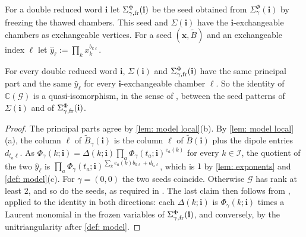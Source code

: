 \documentclass[a4paper]{amsart}
\numberwithin{equation}{section}
\theoremstyle{definition}
\theoremstyle{remark}
\newcommand{\bbC}{\mathbb{C}}
\newcommand{\mcG}{\mathcal{G}}
\newcommand{\mcI}{\mathcal{I}}
\newcommand{\bfi}{\mathbf{i}}
\newcommand{\bx}{\mathbf{x}}
\newcommand{\tB}{\widetilde{B}}
\begin{document}
For a double reduced word $\bfi$ let $\Sigma^\Phi_{\gamma,\rm fr}(\bfi)$ be the seed obtained from $\Sigma^\Phi_\gamma(\bfi)$ by freezing the thawed chambers. This seed and $\Sigma(\bfi)$ have the $\bfi$-exchangeable chambers as exchangeable vertices.
For a seed $(\bx,\tB)$ and an exchangeable index $\ell$ let $\hat y_\ell:=\prod_kx_k^{b_{k\ell}}$.

\begin{corollary}
  \label{cor: Fraser}
  For every double reduced word $\bfi$, $\Sigma(\bfi)$ and $\Sigma^\Phi_{\gamma,\rm fr}(\bfi)$ have the same principal part and the same $\hat y_\ell$ for every $\bfi$-exchangeable chamber $\ell$.
  So the identity of $\bbC(\mcG)$ is a quasi-isomorphism, in the sense of \cite[Definition~3.5]{Fra16}, between the seed patterns of $\Sigma(\bfi)$ and of $\Sigma^\Phi_{\gamma,\rm fr}(\bfi)$.
\end{corollary}
\begin{proof}

  The principal parts agree by \cref{lem: model local}(b).
  By \cref{lem: model local}(a), the column $\ell$ of $\tB_\gamma(\bfi)$ is the column $\ell$ of $\tB(\bfi)$ plus the dipole entries $d_{t_a\ell}$.
  As $\Phi_\gamma(k;\bfi)=\Delta(k;\bfi)\prod_a\Phi_\gamma(t_a;\bfi)^{e_a(k)}$ for every $k\in\mcI$, the quotient of the two $\hat y_\ell$ is $\prod_a\Phi_\gamma(t_a;\bfi)^{\sum_ke_a(k)b_{k\ell}+d_{t_a\ell}}$, which is $1$ by \cref{lem: exponents} and \cref{def: model}(c).
  For $\gamma=(0,0)$ the two seeds coincide. Otherwise $\mcG$ has rank at least $2$, and so do the seeds, as required in \cite[Proposition~2.3]{Fra16}.
  The last claim then follows from \cite[Propositions~2.3 and~3.2]{Fra16}, applied to the identity in both directions: each $\Delta(k;\bfi)$ is $\Phi_\gamma(k;\bfi)$ times a Laurent monomial in the frozen variables of $\Sigma^\Phi_{\gamma,\rm fr}(\bfi)$, and conversely, by the unitriangularity after \cref{def: model}.
\end{proof}
\end{document}
